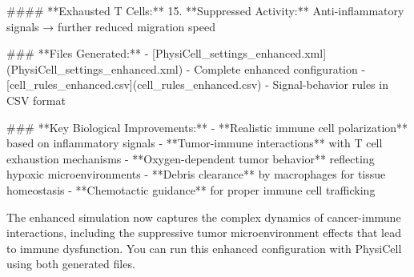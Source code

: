 \documentclass[11pt,a4paper]{article}
\begin{document}
\begin{copilotbox}
\#\#\#\# **Exhausted T Cells:**
15. **Suppressed Activity:** Anti-inflammatory signals → further reduced migration speed

\#\#\# **Files Generated:**
- [PhysiCell\_settings\_enhanced.xml](PhysiCell\_settings\_enhanced.xml) - Complete enhanced configuration
- [cell\_rules\_enhanced.csv](cell\_rules\_enhanced.csv) - Signal-behavior rules in CSV format

\#\#\# **Key Biological Improvements:**
- **Realistic immune cell polarization** based on inflammatory signals
- **Tumor-immune interactions** with T cell exhaustion mechanisms  
- **Oxygen-dependent tumor behavior** reflecting hypoxic microenvironments
- **Debris clearance** by macrophages for tissue homeostasis
- **Chemotactic guidance** for proper immune cell trafficking

The enhanced simulation now captures the complex dynamics of cancer-immune interactions, including the suppressive tumor microenvironment effects that lead to immune dysfunction. You can run this enhanced configuration with PhysiCell using both generated files.

\end{copilotbox}
\end{document}

